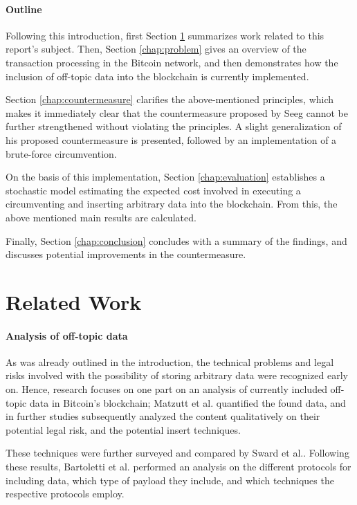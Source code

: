 \documentclass[a4paper,11pt,titlepage]{scrbook}
\begin{document}
\subsubsection*{Outline}

Following this introduction, first Section \ref{chap:relatedwork} summarizes work related to this report's subject.
Then, Section \ref{chap:problem} gives an overview of the transaction processing in the Bitcoin network, and then demonstrates how the inclusion of off-topic data into the blockchain is currently implemented.

Section \ref{chap:countermeasure} clarifies the above-mentioned principles, which makes it immediately clear that the countermeasure proposed by Seeg cannot be further strengthened without violating the principles.
A slight generalization of his proposed countermeasure is presented, followed by an implementation of a brute-force circumvention.

On the basis of this implementation, Section \ref{chap:evaluation} establishes a stochastic model estimating the expected cost involved in executing a circumventing and inserting arbitrary data into the blockchain.
From this, the above mentioned main results are calculated.

Finally, Section \ref{chap:conclusion} concludes with a summary of the findings, and discusses potential improvements in the countermeasure.



\chapter{Related Work}\label{chap:relatedwork}

\subsubsection*{Analysis of off-topic data}

As was already outlined in the introduction, the technical problems and legal risks involved with the possibility of storing arbitrary data were recognized early on.
Hence, research focuses on one part on an analysis of currently included off-topic data in Bitcoin's blockchain; Matzutt et al.\@ \cite{matzutt_poster:_2016} quantified the found data, and in further studies \cite{matzutt_quantitative_2018} subsequently analyzed the content qualitatively on their potential legal risk, and the potential insert techniques.

These techniques were further surveyed and compared by Sward et al.\@ \cite{sward_data_2018}.
Following these results, Bartoletti et al.\@ \cite{bartoletti_journey_2019} performed an analysis on the different protocols for including data, which type of payload they include, and which techniques the respective protocols employ.
\end{document}
